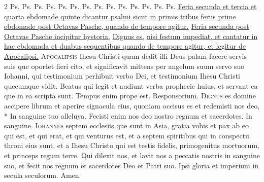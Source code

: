 \begin{multicols*}{2}
  {\color{Red} Ps.}  {\color{Red} Ps.} 
  {\color{Red} Ps.}  {\color{Red} Ps.} 
  {\color{Red} Ps.}  {\color{Red} Ps.} 
  {\color{Red} Ps.}  {\color{Red} Ps.} 
  {\color{Red} Ps.}  {\color{Red} Ps.} 
  {\color{Red} Ps.}  {\color{Red} Ps.} 
  {\color{Red} Ps.}  {\color{Red} Ps.} 
\newline \ul{Feria secunda et tercia et quarta ebdomade quinte dicantur psalmi sicut in primis tribus feriis prime ebdomade post Octavas Pasche, quando de tempore agitur.}
\newline \ul{Feria secunda post Octavas Pasche incipitur hystoria,} \hyperlink{dignus-es}{Dignus es,} \ul{nisi festum impediat, et cantatur in hac ebdomada et duabus sequentibus quando de tempore agitur, et legitur de Apocalipsi.}
\lettrine[lines=2]{\zallmancaps \color{Blue} A}{pocalipsis} Ihesu Christi quam dedit illi Deus palam facere servis suis que oportet fieri cito, et significavit mittens per angelum suum servo suo Iohanni, qui testimonium perhibuit verbo Dei, et testimonium Ihesu Christi quecumque vidit. Beatus qui legit et audiunt verba prophecie huius, et servant ea que in ea scripta sunt. Tempus enim prope est. {\color{Red} Responsorium.}
\lettrine[lines=2]{\zallmancaps \color{Red} D}{ignus} \hypertarget{dignus-es}{\label{dignus-es}} es domine accipere librum et aperire signacula eius, quoniam occisus es et redemisti nos deo, * In sanguine tuo alleluya. \V Fecisti enim nos deo nostro regnum et sacerdotes. In sanguine.
\lettrine[lines=2]{\zallmancaps \color{Blue} I}{ohannes} septem ecclesiis que sunt in Asia, gratia vobis et pax ab eo qui est, et qui erat, et qui venturus est, et a septem spiritibus qui in conspectu throni eius sunt, et a Ihesu Christo qui est testis fidelis, primogenitus mortuorum, et princeps regum terre. Qui dilexit nos, et lavit nos a peccatis nostris in sanguine suo, et fecit nos regnum et sacerdotes Deo et Patri suo. Ipsi gloria et imperium in secula seculorum. Amen.

\end{multicols*}
